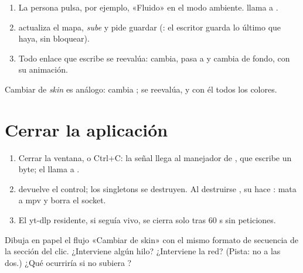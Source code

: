 \begin{enumerate}
  \item La persona pulsa, por ejemplo, «Fluido» en el modo ambiente. 
  llama a .
  \item {} actualiza el mapa, \emph{sube } y pide guardar
  (: el escritor guarda lo último que haya, sin bloquear).
  \item Todo enlace que escribe  se reevalúa:
   cambia,  pasa a  y
   cambia de fondo, con su animación.
\end{enumerate}

Cambiar de \emph{skin} es análogo:  cambia ; 
se reevalúa, y con él todos los colores.

\section{Cerrar la aplicación}

\begin{enumerate}
  \item Cerrar la ventana,  o Ctrl+C: la señal llega al manejador de
  , que escribe un byte; el  llama a
  .
  \item {} devuelve el control; los singletons se destruyen. Al destruirse
  , su  hace : mata a mpv y borra el socket.
  \item El yt-dlp residente, si seguía vivo, se cierra solo tras 60 s sin peticiones.
\end{enumerate}

\begin{ejercicio}
Dibuja en papel el flujo «Cambiar de skin» con el mismo formato de secuencia de la sección del
clic. ¿Interviene algún hilo? ¿Interviene la red? (Pista: no a las dos.) ¿Qué ocurriría si
 no subiera ?
\end{ejercicio}
